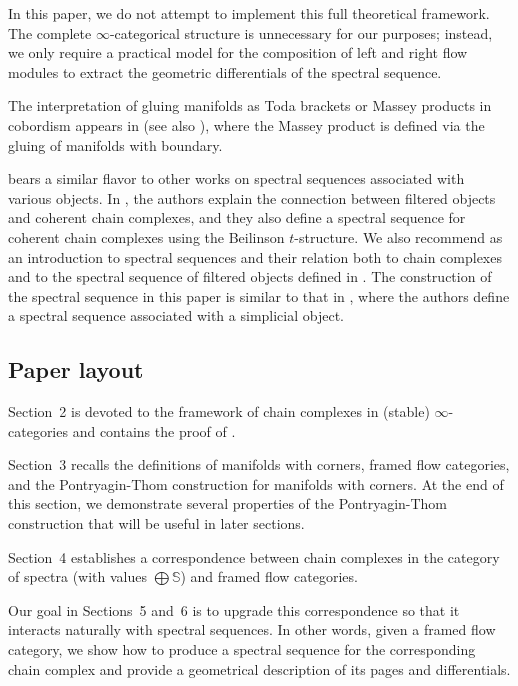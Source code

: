 \begin{rem}
    In this paper, we do not attempt to implement this full theoretical framework. The complete $\infty$-categorical structure is unnecessary for our purposes; instead, we only require a practical model for the composition of left and right flow modules to extract the geometric differentials of the spectral sequence.
\end{rem}

The interpretation of gluing manifolds as Toda brackets or Massey products in cobordism appears in \cite{alexander1972cobordism} (see also \cite{morisugi1983massey}), where the Massey product is defined via the gluing of manifolds with boundary.

 bears a similar flavor to other works on spectral sequences associated with various objects. In \cite{Ari21}, the authors explain the connection between filtered objects and coherent chain complexes, and they also define a spectral sequence for coherent chain complexes using the Beilinson $t$-structure. We also recommend \cite{antieau2024spectral} as an introduction to spectral sequences and their relation both to chain complexes and to the spectral sequence of filtered objects defined in \cite{Lur17}. The construction of the spectral sequence in this paper is similar to that in \cite{blanc2022spectral}, where the authors define a spectral sequence associated with a simplicial object.

\subsection*{Paper layout}
Section~2 is devoted to the framework of chain complexes in (stable) $\infty$-categories and contains the proof of .

Section~3 recalls the definitions of manifolds with corners, framed flow categories, and the Pontryagin-Thom construction for manifolds with corners. At the end of this section, we demonstrate several properties of the Pontryagin-Thom construction that will be useful in later sections.

Section~4 establishes a correspondence between chain complexes in the category of spectra (with values $\bigoplus \mathbb{S}$) and framed flow categories.

Our goal in Sections~5 and~6 is to upgrade this correspondence so that it interacts naturally with spectral sequences. In other words, given a framed flow category, we show how to produce a spectral sequence for the corresponding chain complex and provide a geometrical description of its pages and differentials.

